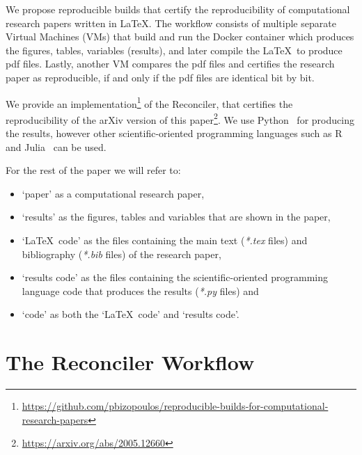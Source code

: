 \documentclass[journal]{IEEEtran}
\begin{document}
We propose reproducible builds that certify the reproducibility of computational research papers written in \LaTeX.
The workflow consists of multiple separate Virtual Machines (VMs) that build and run the Docker container which produces the figures, tables, variables (results), and later compile the \LaTeX\ to produce pdf files.
Lastly, another VM compares the pdf files and certifies the research paper as reproducible, if and only if the pdf files are identical bit by bit.

We provide an implementation\footnote{\url{https://github.com/pbizopoulos/reproducible-builds-for-computational-research-papers}} of the Reconciler, that certifies the reproducibility of the arXiv version of this paper\footnote{\url{https://arxiv.org/abs/2005.12660}}.
We use Python~\cite{van2007python} for producing the results, however other scientific-oriented programming languages such as R~\cite{ihaka1996r} and Julia~\cite{bezanson2017julia} can be used.

For the rest of the paper we will refer to:
\begin{itemize}
	\item `paper' as a computational research paper,
	\item `results' as the figures, tables and variables that are shown in the paper,
	\item `\LaTeX\ code' as the files containing the main text (\textit{*.tex} files) and bibliography (\textit{*.bib} files) of the research paper,
	\item `results code' as the files containing the scientific-oriented programming language code that produces the results (\textit{*.py} files) and
	\item `code' as both the `\LaTeX\ code' and `results code'.
\end{itemize}

\section{The Reconciler Workflow}
\end{document}
